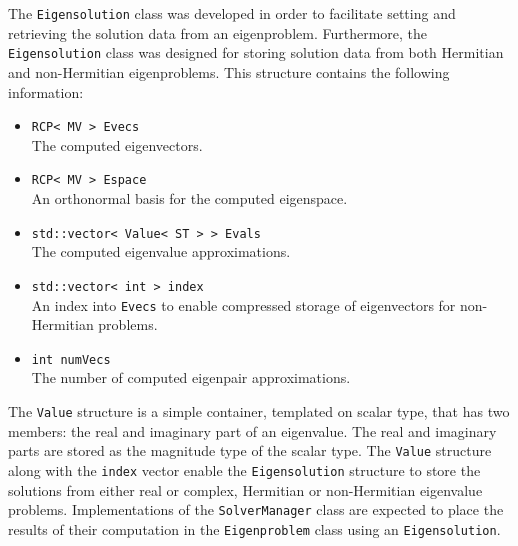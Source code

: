 \documentclass[acmtoms]{acmtrans2m}
\newcommand{\aspace}[1]{\texttt{#1}}
\begin{document}
The \aspace{Eigensolution} class was developed in order to
facilitate setting and retrieving the solution data from an eigenproblem.  
Furthermore, the \aspace{Eigensolution} class was designed for storing
solution data from both Hermitian and non-Hermitian eigenproblems. 
This structure contains the following information:
\begin{itemize}
  \item \verb!RCP< MV > Evecs! \\
   The computed eigenvectors.
 \item \verb!RCP< MV > Espace! \\
   An orthonormal basis for the computed eigenspace.
 \item \verb!std::vector< Value< ST > > Evals! \\
   The computed eigenvalue approximations.
 \item \verb!std::vector< int > index! \\
   An index into \verb!Evecs! to enable compressed storage of eigenvectors for non-Hermitian problems.
 \item \verb!int numVecs! \\
   The number of computed eigenpair approximations.
\end{itemize}
The \aspace{Value} structure is a simple container, templated on scalar type, that
has two members: the real and imaginary part of an eigenvalue.  The real and imaginary
parts are stored as the magnitude type of the scalar type.  The \aspace{Value} structure
along with the \verb!index! vector enable the \aspace{Eigensolution} structure to 
store the solutions from either real or complex, Hermitian or non-Hermitian eigenvalue
problems. Implementations of the \aspace{SolverManager} class are expected to place the 
results of their computation in the \aspace{Eigenproblem} class using an \aspace{Eigensolution}. 
\end{document}
